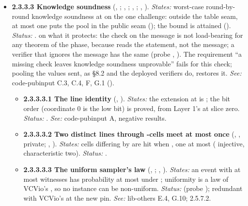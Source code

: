 \begin{itemize}[label={}, leftmargin=1.3em, itemindent=-1.3em, labelwidth=0pt, labelsep=0pt, itemsep=4pt, topsep=3pt]
\item {}\label{obl:node-2.3.3.3}\oblflag\textbf{2.3.3.3 Knowledge soundness} (, ; , ; , ; , ). \emph{States:} worst-case round-by-round knowledge soundness at  on the one challenge: outside the table seam, at most one  puts the pool in the public seam (); the bound is attained (). \emph{Status:} .  on what it protects: the check on the message is not load-bearing for any theorem of the phase, because  reads the statement, not the message; a verifier that ignores the message has the same  (probe , ). The requirement ``a missing check leaves knowledge soundness unprovable'' fails for this check; pooling the values sent, as §8.2 and the deployed verifiers do, restores it. \emph{See:} code-pubinput C.3, C.4, F, G.1 ().
\begin{itemize}[label={}, leftmargin=1.3em, itemindent=-1.3em, labelwidth=0pt, labelsep=0pt, itemsep=4pt, topsep=3pt]
\item {}\label{obl:node-2.3.3.3.1}\textbf{2.3.3.3.1 The line identity} (, ). \emph{States:} the extension at  is ; the bit order (coordinate 0 is the low bit) is proved, from Layer 1's  at slice zero. \emph{Status:} . \emph{See:} code-pubinput A, negative results.
\item {}\label{obl:node-2.3.3.3.2}\textbf{2.3.3.3.2 Two distinct lines through -cells meet at most once} (, , private; , ). \emph{States:} cells differing by  are hit when , one  at most ( injective, characteristic two). \emph{Status:} .
\item {}\label{obl:node-2.3.3.3.3}\textbf{2.3.3.3.3 The uniform sampler's law} (, ; , ). \emph{States:} an event with at most  witnesses has probability at most  under ; uniformity is a law of VCVio's , so no instance can be non-uniform. \emph{Status:}  (probe ); redundant with VCVio's  at the new pin. \emph{See:} lib-others E.4, G.10; 2.5.7.2.

\end{itemize}
\end{itemize}
